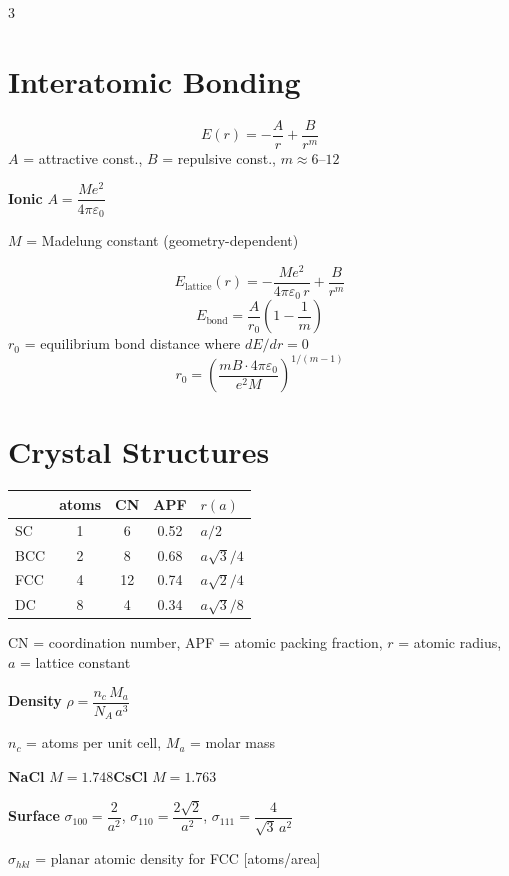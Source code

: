 \documentclass[9pt]{extarticle}
\newcommand{\eqlabel}[1]{\textbf{\scriptsize #1}\;}
\newcommand{\vardef}[1]{{\footnotesize\color{defgray}#1}}
\begin{document}
\begin{multicols}{3}

\section{Interatomic Bonding}
\[E(r) = -\frac{A}{r} + \frac{B}{r^m}\]
\vardef{$A$ = attractive const., $B$ = repulsive const., $m \approx 6$--$12$}

\eqlabel{Ionic} $A = \dfrac{Me^2}{4\pi\varepsilon_0}$

\vardef{$M$ = Madelung constant (geometry-dependent)}

\[E_{\text{lattice}}(r) = -\frac{Me^2}{4\pi\varepsilon_0\,r} + \frac{B}{r^m}\]
\[E_{\text{bond}} = \frac{A}{r_0}\left(1 - \frac{1}{m}\right)\]
\vardef{$r_0$ = equilibrium bond distance where $dE/dr = 0$}
\[r_0 = \left(\frac{mB\cdot 4\pi\varepsilon_0}{e^2 M}\right)^{1/(m-1)}\]

\section{Crystal Structures}
\begin{tabular}{@{}l c c c l@{}}
\toprule
& \footnotesize atoms & \footnotesize CN & \footnotesize APF & \footnotesize $r(a)$ \\
\midrule
SC & 1 & 6 & 0.52 & $a/2$ \\
BCC & 2 & 8 & 0.68 & $a\sqrt{3}/4$ \\
FCC & 4 & 12 & 0.74 & $a\sqrt{2}/4$ \\
DC & 8 & 4 & 0.34 & $a\sqrt{3}/8$ \\
\bottomrule
\end{tabular}

\vardef{CN = coordination number, APF = atomic packing fraction, $r$ = atomic radius, $a$ = lattice constant}

\smallskip
\eqlabel{Density} $\rho = \dfrac{n_c\,M_a}{N_A\,a^3}$

\vardef{$n_c$ = atoms per unit cell, $M_a$ = molar mass}

\eqlabel{NaCl} $M = 1.748$\quad \eqlabel{CsCl} $M = 1.763$

\eqlabel{Surface} $\sigma_{100} = \dfrac{2}{a^2}$, \; $\sigma_{110} = \dfrac{2\sqrt{2}}{a^2}$, \; $\sigma_{111} = \dfrac{4}{\sqrt{3}\,a^2}$

\vardef{$\sigma_{hkl}$ = planar atomic density for FCC [atoms/area]}


\end{multicols}
\end{document}
